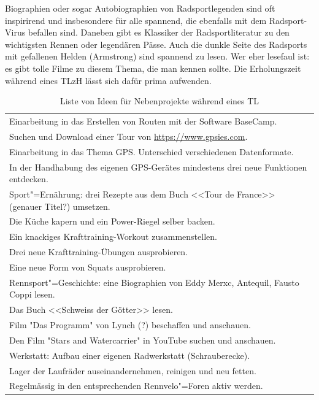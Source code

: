 \documentclass[a4paper,DIV13,BCOR0cm,draft=TRUE]{scrartcl}
\newcommand{\rv}{Rennvelo}
\newcommand{\tlzh}{TLzH}
\begin{document}
Biographien oder sogar Autobiographien von Radsportlegenden sind oft inspirirend
und insbesondere für alle spannend, die ebenfalls mit dem Radsport-Virus befallen sind.
Daneben gibt es Klassiker der Radsportliteratur zu den wichtigsten Rennen oder legendären Pässe.
Auch die dunkle Seite des Radsports mit gefallenen Helden (Armstrong) sind spannend zu lesen.
Wer eher lesefaul ist: es gibt tolle Filme zu diesem Thema, die man kennen sollte.
Die Erholungszeit während eines \tlzh{} lässt sich dafür prima aufwenden.


\begin{table}
  \centering
  \begin{tabular}{l}
    \toprule
         Einarbeitung in das Erstellen von Routen mit der Software BaseCamp.\\
         Suchen und Download einer Tour von \url{https://www.gpsies.com}.\\
         Einarbeitung in das Thema GPS. Unterschied verschiedenen Datenformate.\\
         In der Handhabung des eigenen GPS-Gerätes mindestens drei neue Funktionen entdecken.\\
         Sport"=Ernährung: drei Rezepte aus dem Buch <<Tour de France>> (genauer Titel?) umsetzen.\\
         Die Küche kapern und ein Power-Riegel selber backen.\\
         Ein knackiges Krafttraining-Workout zusammenstellen.\\
         Drei neue Krafttraining-Übungen ausprobieren.\\
         Eine neue Form von Squats ausprobieren.\\
         Rennsport"=Geschichte: eine Biographien von Eddy Merxc, Antequil, Fausto Coppi lesen.\\
         Das Buch <<Schweiss der Götter>> lesen.\\
         Film "Das Programm" von Lynch (?) beschaffen und anschauen.\\
         Den Film "Stars and Watercarrier" in YouTube suchen und anschauen.\\
         Werkstatt: Aufbau einer eigenen Radwerkstatt (Schrauberecke).\\
         Lager der Laufräder auseinandernehmen, reinigen und neu fetten.\\
         Regelmässig in den entsprechenden \rv"=Foren aktiv werden.\\
    \bottomrule
  \end{tabular}
  \caption{Liste von Ideen für Nebenprojekte während eines TL}
  \label{tab:liste-nebenprojekte}
\end{table}
\end{document}
